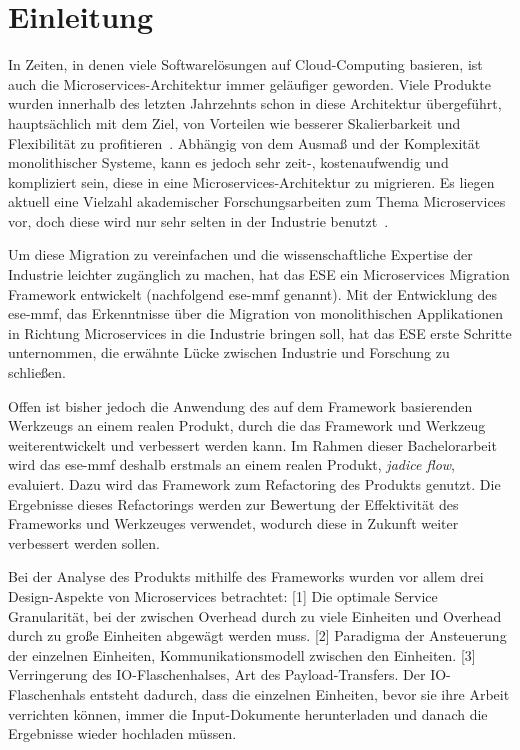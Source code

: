 \chapter{Einleitung}
\label{chap:einleitung}

In Zeiten, in denen viele Softwarelösungen auf Cloud-Computing basieren, ist auch die Microservices-Architektur immer geläufiger geworden.
Viele Produkte wurden innerhalb des letzten Jahrzehnts schon in diese Architektur übergeführt, hauptsächlich mit dem Ziel, von Vorteilen wie besserer Skalierbarkeit und Flexibilität zu profitieren~\cite{Fritzsch_2019}.
Abhängig von dem Ausmaß und der Komplexität monolithischer Systeme, kann es jedoch sehr zeit-, kostenaufwendig und kompliziert sein, diese in eine Microservices-Architektur zu migrieren.
Es liegen aktuell eine Vielzahl akademischer Forschungsarbeiten zum Thema Microservices vor, doch diese wird nur sehr selten in der Industrie benutzt~\cite{fritzsch2022architecturecentric}.

Um diese Migration zu vereinfachen und die wissenschaftliche Expertise der Industrie leichter zugänglich zu machen, hat das ESE ein Microservices Migration Framework entwickelt (nachfolgend \acrshort{ese-mmf} genannt).
Mit der Entwicklung des \acrshort{ese-mmf}, das Erkenntnisse über die Migration von monolithischen Applikationen in Richtung Microservices in die Industrie bringen soll, hat das ESE erste Schritte unternommen, die erwähnte Lücke zwischen Industrie und Forschung zu schließen.

Offen ist bisher jedoch die Anwendung des auf dem Framework basierenden Werkzeugs an einem realen Produkt, durch die das Framework und Werkzeug weiterentwickelt und verbessert werden kann.
Im Rahmen dieser Bachelorarbeit wird das \acrshort{ese-mmf} deshalb erstmals an einem realen Produkt, \emph{jadice flow}, evaluiert.
Dazu wird das Framework zum Refactoring des Produkts genutzt.
Die Ergebnisse dieses Refactorings werden zur Bewertung der Effektivität des Frameworks und Werkzeuges verwendet, wodurch diese in Zukunft weiter verbessert werden sollen.

Bei der Analyse des Produkts mithilfe des Frameworks wurden vor allem drei Design-Aspekte von Microservices betrachtet:
[1] Die optimale Service Granularität, bei der zwischen Overhead durch zu viele Einheiten und Overhead durch zu große Einheiten abgewägt werden muss.
[2] Paradigma der Ansteuerung der einzelnen Einheiten, Kommunikationsmodell zwischen den Einheiten.
[3] Verringerung des IO-Flaschenhalses, Art des Payload-Transfers.
Der IO-Flaschenhals entsteht dadurch, dass die einzelnen Einheiten, bevor sie ihre Arbeit verrichten können, immer die Input-Dokumente herunterladen und danach die Ergebnisse wieder hochladen müssen.


